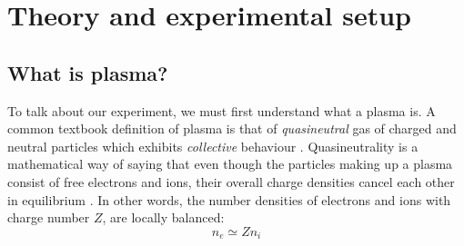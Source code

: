 \section{Theory and experimental setup}

\subsection{What is plasma?}
To talk about our experiment, we must first understand what a plasma is.
A common textbook definition of plasma is that of \emph{quasineutral} gas of charged and neutral particles which exhibits \emph{collective} behaviour \cite{chen_introduction_2006}.
Quasineutrality is a mathematical way of saying that even though the particles making up a plasma consist of free electrons and ions, 
their overall charge densities cancel each other in equilibrium \cite{gibbon_introduction_2016}.
In other words, the number densities of electrons and ions with charge number $Z$, are locally balanced:
\begin{equation}
    n_e \simeq Z n_i
\end{equation}
